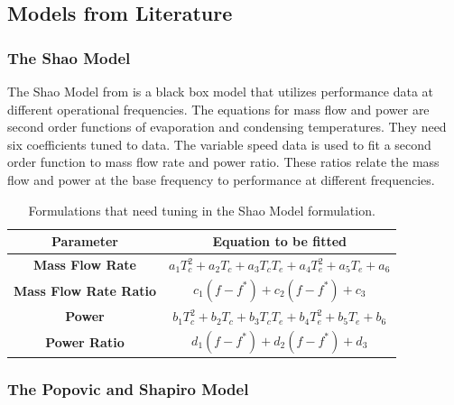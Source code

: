 \documentclass[preprint,11pt,authoryear]{elsarticle}
\begin{document}
\subsection{Models from Literature}
\subsubsection{The Shao Model}
The Shao Model from \cite{Shao2004a} is a black box model that utilizes performance data at different  operational frequencies. The equations for mass flow and power are second order functions of evaporation and condensing temperatures. They need six coefficients tuned to data. The variable speed data is used to fit a second order function to mass flow rate and power ratio. These ratios relate the  mass flow and power at the base frequency to performance at different frequencies.
  
\def\arraystretch{1.5}
\begin{table}[h]
\caption{Formulations that need tuning in the Shao Model formulation.}
\label{Tab:shao_eqs}
\begin{center}
\begin{tabular}{c c}
\hline
\hline
\textbf{Parameter} & Equation to be fitted \\
\hline %
\textbf{Mass Flow Rate} & \(\displaystyle a_1T_c^{2}+a_2T_c+a_3T_cT_e+a_4T_e^{2}+a_5T_e+a_6 \) \\
\textbf{Mass Flow Rate Ratio} & \(\displaystyle c_1(f-f^{*})+c_2(f-f^{*})+c_3 \)
\\
\textbf{Power} & \(\displaystyle b_1T_c^{2}+b_2T_c+b_3T_cT_e+b_4T_e^{2}+b_5T_e+b_6 \)
\\
\textbf{Power Ratio} & \(\displaystyle d_1(f-f^{*})+d_2(f-f^{*})+d_3 \)
\\
\hline
\hline
\end{tabular}
\end{center}
\end{table}



\subsubsection{The Popovic and Shapiro Model}
\end{document}

